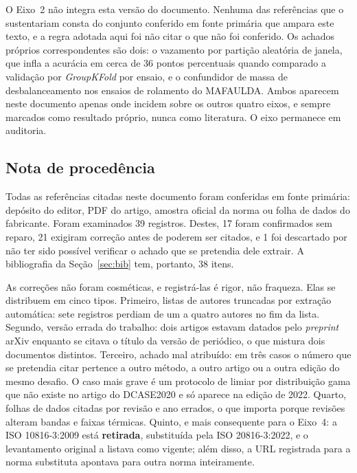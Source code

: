 \documentclass[11pt,a4paper]{article}
\begin{document}
O Eixo~2 não integra esta versão do documento. Nenhuma das referências que o sustentariam
consta do conjunto conferido em fonte primária que ampara este texto, e a regra adotada
aqui foi não citar o que não foi conferido. Os achados próprios correspondentes são dois:
o vazamento por partição aleatória de janela, que infla a acurácia em cerca de 36 pontos
percentuais quando comparado a validação por \emph{GroupKFold} por ensaio, e o confundidor
de massa de desbalanceamento nos ensaios de rolamento do MAFAULDA. Ambos aparecem neste
documento apenas onde incidem sobre os outros quatro eixos, e sempre marcados como
resultado próprio, nunca como literatura. O eixo permanece em auditoria.

\subsection{Nota de procedência}

Todas as referências citadas neste documento foram conferidas em fonte primária:
depósito do editor, PDF do artigo, amostra oficial da norma ou folha de dados do
fabricante. Foram examinados \num{39} registros. Destes, \num{17} foram confirmados sem
reparo, \num{21} exigiram correção antes de poderem ser citados, e \num{1} foi descartado
por não ter sido possível verificar o achado que se pretendia dele extrair. A
bibliografia da Seção~\ref{sec:bib} tem, portanto, \num{38} itens.

As correções não foram cosméticas, e registrá-las é rigor, não fraqueza. Elas se
distribuem em cinco tipos. Primeiro, listas de autores truncadas por extração automática:
sete registros perdiam de um a quatro autores no fim da lista. Segundo, versão errada do
trabalho: dois artigos estavam datados pelo \emph{preprint} arXiv enquanto se citava o
título da versão de periódico, o que mistura dois documentos distintos. Terceiro, achado
mal atribuído: em três casos o número que se pretendia citar pertence a outro método, a
outro artigo ou a outra edição do mesmo desafio. O caso mais grave é um protocolo de
limiar por distribuição gama que não existe no artigo do DCASE2020 e só aparece na edição
de 2022. Quarto, folhas de dados citadas por revisão e ano errados, o que importa porque
revisões alteram bandas e faixas térmicas. Quinto, e mais consequente para o
Eixo~4: a ISO 10816-3:2009 está \textbf{retirada}, substituída pela ISO 20816-3:2022, e o
levantamento original a listava como vigente; além disso, a URL registrada para a norma
substituta apontava para outra norma inteiramente.
\end{document}
